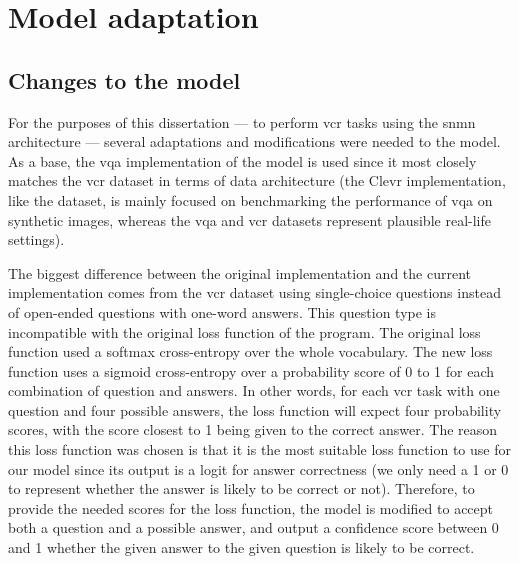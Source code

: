 \section{Model adaptation}
\label{sec:model_adaptation}

\subsection{Changes to the model}
\label{subsec:changes_to_the_model}

For the purposes of this dissertation --- to perform \gls{vcr} tasks using the \gls{snmn} architecture --- several adaptations and modifications were needed to the model.
As a base, the \gls{vqa} implementation of the model is used since it most closely matches the \gls{vcr} dataset in terms of data architecture (the Clevr implementation, like the dataset, is mainly focused on benchmarking the performance of \gls{vqa} on synthetic images, whereas the \gls{vqa} and \gls{vcr} datasets represent plausible real-life settings).

The biggest difference between the original implementation and the current implementation comes from the \gls{vcr} dataset using single-choice questions instead of open-ended questions with one-word answers.
This question type is incompatible with the original loss function of the program.
The original loss function used a softmax cross-entropy over the whole vocabulary.
The new loss function uses a sigmoid cross-entropy over a probability score of 0 to 1 for each combination of question and answers.
In other words, for each \gls{vcr} task with one question and four possible answers, the loss function will expect four probability scores, with the score closest to 1 being given to the correct answer.
The reason this loss function was chosen is that it is the most suitable loss function to use for our model since its output is a \gls{logit} for answer correctness (we only need a 1 or 0 to represent whether the answer is likely to be correct or not).
Therefore, to provide the needed scores for the loss function, the model is modified to accept both a question and a possible answer, and output a confidence score between 0 and 1 whether the given answer to the given question is likely to be correct.

